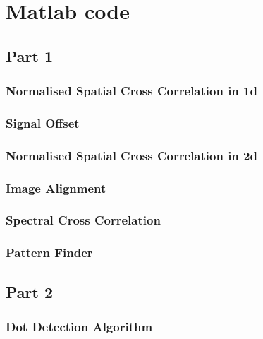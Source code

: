 \chapter{Matlab code }
\section{Part 1}
\subsection{Normalised Spatial Cross Correlation in 1d}
 \label{code:1.1}

\subsection{Signal Offset}
 \label{code:1.2}

\subsection{Normalised Spatial Cross Correlation in 2d}
 \label{code:1.3}

\subsection{Image Alignment}
 \label{code:1.4}

\subsection{Spectral Cross Correlation}
 \label{code:1.5}

\subsection{Pattern Finder}
 \label{code:1.6}

\section{Part 2}
\subsection{Dot Detection Algorithm}
 \label{code:2.1}

